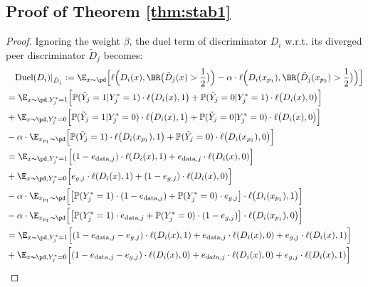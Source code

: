 \subsection{Proof of Theorem \ref{thm:stab1}}
\begin{proof}
Ignoring the weight $\beta$, the duel term of discriminator $D_i$ w.r.t. its diverged peer discriminator $\tilde{D}_{j}$ becomes:
{\begin{align}\label{eqn:split}
    &\quad\text{Duel}(D_i)|_{\tilde{D}_{j}}:= \E_{x\thicksim \pd}\Big[\ell\Big(D_i(x),\BR\big(\tilde{D}_{j}(x)>\dfrac{1}{2}\big)\Big)-\alpha \cdot \ell\Big(D_i(x_{p_1}),\BR\big(\tilde{D}_{j}(x_{p_2})>\dfrac{1}{2}\big)\Big)\Big]\notag\\
    &=\E_{x\thicksim \pd,Y^*_j=1}\Big[\mathbb{P}(\tilde{Y}_j=1|Y^*_j=1)\cdot \ell\big(D_{i}(x),1\big)+\mathbb{P}(\tilde{Y}_j=0|Y^*_j=1)\cdot \ell\big(D_{i}(x),0\big)\Big]\notag
    \\
    &+\E_{x\thicksim \pd,Y^*_j=0}\Big[\mathbb{P}(\tilde{Y}_j=1|Y^*_j=0)\cdot \ell\big(D_{i}(x),1\big)+\mathbb{P}(\tilde{Y}_j=0|Y^*_j=0)\cdot \ell\big(D_{i}(x),0\big)\Big]\notag\\
    &-\alpha \cdot \E_{x_{p_1}\thicksim \pd}\Big[\mathbb{P}(\tilde{Y}_{j}=1)\cdot \ell\big(D_{i}(x_{p_1}),1\big)+\mathbb{P}(\tilde{Y}_{j}=0)\cdot \ell\big(D_{i}(x_{p_1}),0\big)\Big]\notag\\
    &=\E_{x\thicksim \pd,Y^*_j=1}\Big[(1-e_{\text{data}, j})\cdot \ell(D_{i}(x),1)+e_{\text{data}, j}\cdot \ell(D_{i}(x),0)\Big]
    \notag\\
    &+\E_{x\thicksim \pd,Y^*_j=0}\Big[e_{g,j}\cdot \ell(D_{i}(x),1)+(1-e_{g,j})\cdot \ell(D_{i}(x),0)\Big]\notag\\
    &-\alpha \cdot \E_{x_{p_1}\thicksim \pd}\Big[\big[\mathbb{P}(Y^*_j=1)\cdot (1-e_{\text{data},j})+\mathbb{P}(Y^*_j=0)\cdot e_{g,j}\big]\cdot \ell\big(D_{i}(x_{p_1}),1\big)\Big]\notag\\
    &-\alpha \cdot \E_{x_{p_1}\thicksim \pd}\Big[\big[\mathbb{P}(Y^*_j=1)\cdot e_{\text{data},j}+\mathbb{P}(Y^*_j=0)\cdot (1-e_{g,j})\big]\cdot \ell\big(D_{i}(x_{p_1}),0\big)\Big]\notag\\
    &=\E_{x\thicksim \pd,Y_j^*=1}\Big[(1-e_{\text{data}, j}-e_{g, j})\cdot \ell(D_{i}(x),1)+e_{\text{data}, j}\cdot \ell(D_{i}(x),0)+e_{g, j}\cdot \ell(D_{i}(x),1)\Big]
   \notag \\
    &+\E_{x\thicksim \pd,Y_j^*=0}\Big[(1-e_{\text{data}, j}-e_{g,j})\cdot \ell(D_{i}(x),0)+e_{data,j}\cdot \ell(D_{i}(x),0)+e_{g,j}\cdot \ell(D_{i}(x),1)\Big]\notag\\

\end{align}}
\end{proof}
